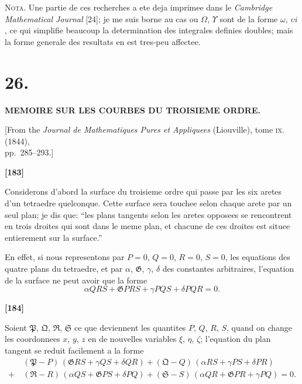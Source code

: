 \documentclass[11pt,a4paper]{book}
\begin{document}
\textsc{Nota.} Une partie de ces recherches a ete deja imprimee dans le \textit{Cambridge
Mathematical Journal} [24]; je me suis borne au cas ou $\Omega$, $\Upsilon$ sont de la forme $\omega$, $\upsilon i$, ce
qui simplifie beaucoup la determination des integrales definies doubles; mais la forme
generale des resultats en est tres-peu affectee.

\newpage
\section*{26.}

\begin{center}
\textbf{MEMOIRE SUR LES COURBES DU TROISIEME ORDRE.}
\end{center}

\begin{center}
[From the \textit{Journal de Mathematiques Pures et Appliquees} (Liouville), tome \textsc{ix}. (1844),\\
pp.~285--293.]
\end{center}


\textbf{[183]}

Considerons d'abord la surface du troisieme ordre qui passe par les six aretes d'un
tetraedre quelconque. Cette surface sera touchee selon chaque arete par un seul plan;
je dis que: ``les plans tangents selon les aretes opposees se rencontrent en trois droites
qui sont dans le meme plan, et chacune de ces droites est situee entierement sur la
surface.''

En effet, si nous representons par $P = 0$, $Q = 0$, $R = 0$, $S = 0$, les equations des quatre
plans du tetraedre, et par $\alpha$, $\mathfrak{G}$, $\gamma$, $\delta$ des constantes arbitraires, l'equation de la surface
ne peut avoir que la forme
\[\alpha QRS + \mathfrak{G} PRS + \gamma PQS + \delta PQR = 0.\]

\textbf{[184]}

Soient $\mathfrak{P}$, $\mathfrak{Q}$, $\mathfrak{R}$, $\mathfrak{S}$ ce que deviennent les quantites $P$, $Q$, $R$, $S$, quand on change les
coordonnees $x$, $y$, $z$ en de nouvelles variables $\xi$, $\eta$, $\zeta$; l'equation du plan tangent se reduit
facilement a la forme
\begin{align*}
&(\mathfrak{P} - P)\, (\mathfrak{G}RS + \gamma QS + \delta QR) + (\mathfrak{Q} - Q)\, (\alpha RS + \gamma PS + \delta PR)\\
+\ &(\mathfrak{R} - R)\, (\alpha QS + \mathfrak{G}PS + \delta PQ) + (\mathfrak{S} - S)\, (\alpha QR + \mathfrak{G}PR + \gamma PQ) = 0.
\end{align*}
\end{document}
